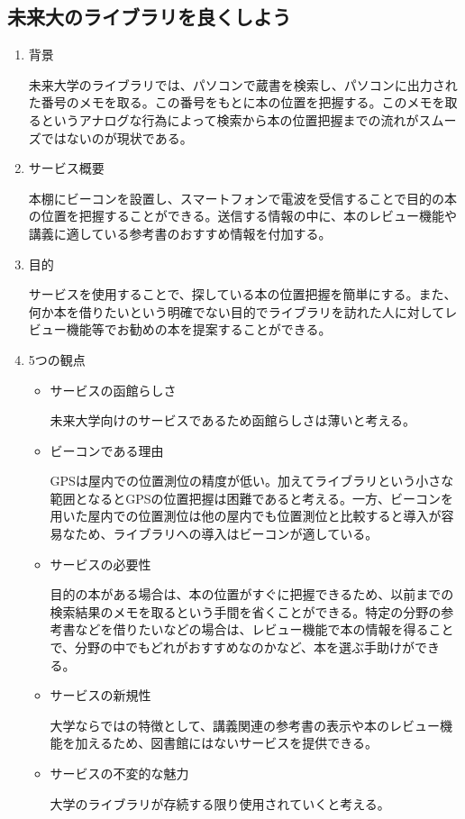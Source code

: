 \subsection{未来大のライブラリを良くしよう}
\begin{enumerate}
    \item 背景
    \par 未来大学のライブラリでは、パソコンで蔵書を検索し、パソコンに出力された番号のメモを取る。この番号をもとに本の位置を把握する。このメモを取るというアナログな行為によって検索から本の位置把握までの流れがスムーズではないのが現状である。
    \item サービス概要
    \par 本棚にビーコンを設置し、スマートフォンで電波を受信することで目的の本の位置を把握することができる。送信する情報の中に、本のレビュー機能や講義に適している参考書のおすすめ情報を付加する。
    \item 目的
    \par サービスを使用することで、探している本の位置把握を簡単にする。また、何か本を借りたいという明確でない目的でライブラリを訪れた人に対してレビュー機能等でお勧めの本を提案することができる。
    \item 5つの観点
    \begin{itemize}
        \item サービスの函館らしさ
        \par 未来大学向けのサービスであるため函館らしさは薄いと考える。
        \item ビーコンである理由
        \par GPSは屋内での位置測位の精度が低い。加えてライブラリという小さな範囲となるとGPSの位置把握は困難であると考える。一方、ビーコンを用いた屋内での位置測位は他の屋内でも位置測位と比較すると導入が容易なため、ライブラリへの導入はビーコンが適している。
        \item サービスの必要性
        \par 目的の本がある場合は、本の位置がすぐに把握できるため、以前までの検索結果のメモを取るという手間を省くことができる。特定の分野の参考書などを借りたいなどの場合は、レビュー機能で本の情報を得ることで、分野の中でもどれがおすすめなのかなど、本を選ぶ手助けができる。
        \item サービスの新規性
        \par 大学ならではの特徴として、講義関連の参考書の表示や本のレビュー機能を加えるため、図書館にはないサービスを提供できる。
        \item サービスの不変的な魅力
        \par 大学のライブラリが存続する限り使用されていくと考える。
    \end{itemize}
\end{enumerate}

